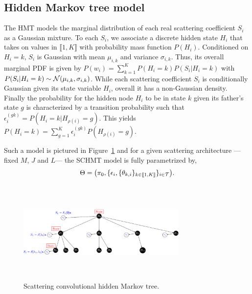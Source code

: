 \documentclass{article}
\begin{document}
  \vspace{-5pt}
  \subsection{Hidden Markov tree model}
    \label{subsec:SCHMT/HMT model}
    \vspace{-5pt}
    The HMT models the marginal distribution of each real scattering coefficient $S_i$ as a Gaussian mixture. To each $S_i$, we associate a discrete hidden state $H_i$ that takes on values in $\llbracket 1,K \rrbracket$ with probability mass function $P(H_i)$. Conditioned on $H_i = k$, $S_i$ is Gaussian with mean $\mu_{i,k}$ and variance $\sigma_{i,k}$. Thus, its overall marginal PDF is given by $P(w_i) = \sum_{k=1}^{K} P(H_i = k)P(S_i| H_i=k)$ with $P(S_i|H_i=k) \sim \mathcal{N}(\mu_{i,k}, \sigma_{i,k})$. While each scattering coefficient $S_i$ is conditionally Gaussian given its state variable $H_i$, overall it has a non-Gaussian density. Finally the probability for the hidden node $H_{i}$ to be in state $k$ given its father's state $g$ is characterized by a transition probability such that $\epsilon_{i}^{(gk)} = P(H_{i}= k | H_{\rho(i)}=g)$. This yields $P(H_{i}=k) = \sum_{g=1}^{K} \epsilon_{i}^{(gk)} P(H_{\rho(i)}=g)$.

    Such a model is pictured in Figure~\ref{fig:SCHMT 1} and for a given scattering architecture ---\ie fixed $M$, $J$ and $L$--- the SCHMT model is fully parametrized by,
    \vspace{-5pt}
    \begin{equation}
      \Theta = \big(\pi_{0}, \{ \epsilon_{i}, \{ \theta_{k,i} \}_{k\in\llbracket1,K\rrbracket} \}_{i\in\mathcal{T}}\big).
      \label{eq:SCHMT - parameters}
    \end{equation}
    \vspace{-15pt}

    \begin{figure}
      \begin{center}
        \includegraphics[width=3.3in, height=2in, keepaspectratio]{scat_HMT_crop.pdf}
        \caption{Scattering convolutional hidden Markov tree.}
        \label{fig:SCHMT 1}
      \end{center}
      \vspace{-15pt}
    \end{figure}
    
\end{document}
